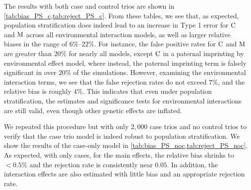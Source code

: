 The results with both case and control trios are shown in \cref{tab:bias_PS_c,tab:reject_PS_c}.
From these tables, we see that, as expected, population stratification does indeed lead to an increase in Type 1 error for ${\rm C}$ and ${\rm M}$ across all environmental interaction models, as well as larger relative biases in the range of $6\%$--$22\%$.
For instance, the false positive rates for ${\rm C}$ and ${\rm M}$ are greater than $20\%$ for nearly all models, except ${\rm C}$ in a paternal imprinting by environmental effect model, where instead, the paternal imprinting term is falsely significant in over $20\%$ of the simulations.
However, examining the environmental interaction terms, we see that the false rejection rates do not exceed $7\%$, and the relative bias is roughly $4\%$.
This indicates that even under population stratification, the estimates and significance tests for environmental interactions are still valid, even though other genetic effects are inflated.

We repeated this procedure but with only $2,000$ case trios and no control trios to verify that the case trio model is indeed robust to population stratification.
We show the results of the case-only model in \cref{tab:bias_PS_noc,tab:reject_PS_noc}.
As expected, with only cases, for the main effects, the relative bias shrinks to $<0.5\%$ and the rejection rate is consistently near $0.05$.
In addition, the interaction effects are also estimated with little bias and an appropriate rejection rate.

\newpage


\newpage


\newpage

\vfill
\cleardoublepage

